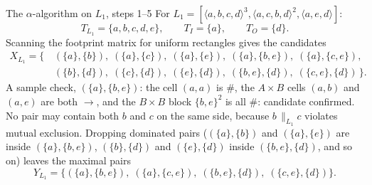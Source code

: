 \begin{examplebox}{The $\alpha$-algorithm on $L_1$, steps 1--5}
For $L_1 = [\langle a, b, c, d\rangle^3, \langle a, c, b, d\rangle^2, \langle a, e, d\rangle]$:
\[
  T_{L_1} = \{a, b, c, d, e\}, \qquad T_I = \{a\}, \qquad T_O = \{d\}.
\]
Scanning the footprint matrix for uniform rectangles gives the candidates
\begin{align*}
X_{L_1} = \big\{\, & (\{a\}, \{b\}),\; (\{a\}, \{c\}),\; (\{a\}, \{e\}),\; (\{a\}, \{b, e\}),\; (\{a\}, \{c, e\}), \\
                  & (\{b\}, \{d\}),\; (\{c\}, \{d\}),\; (\{e\}, \{d\}),\; (\{b, e\}, \{d\}),\; (\{c, e\}, \{d\}) \,\big\}.
\end{align*}
A sample check, $(\{a\}, \{b, e\})$: the cell $(a, a)$ is $\#$, the $A \times B$ cells $(a, b)$ and $(a, e)$ are both $\to$, and the $B \times B$ block $\{b, e\}^2$ is all $\#$: candidate confirmed. No pair may contain both $b$ and $c$ on the same side, because $b \,\|_{L_1} c$ violates mutual exclusion. Dropping dominated pairs ($(\{a\}, \{b\})$ and $(\{a\}, \{e\})$ are inside $(\{a\}, \{b, e\})$, $(\{b\}, \{d\})$ and $(\{e\}, \{d\})$ inside $(\{b, e\}, \{d\})$, and so on) leaves the maximal pairs
\[
  Y_{L_1} = \big\{ (\{a\}, \{b, e\}),\; (\{a\}, \{c, e\}),\; (\{b, e\}, \{d\}),\; (\{c, e\}, \{d\}) \big\}.
\]
\end{examplebox}

